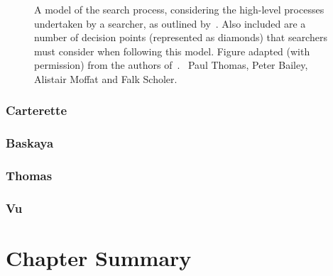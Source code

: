 \begin{figure}[t!]
    \centering
    \caption[Model of the search process by~\cite{thomas2014modelling_behaviour}]{A model of the search process, considering the high-level processes undertaken by a searcher, as outlined by~\cite{thomas2014modelling_behaviour}. Also included are a number of decision points (represented as diamonds) that searchers must consider when following this model. Figure adapted (with permission) from the authors of~\citealt{thomas2014modelling_behaviour}. \textcopyright~Paul Thomas, Peter Bailey, Alistair Moffat and Falk Scholer.}
    \label{fig:thomas_model}
\end{figure}

\subsubsection{Carterette}

\subsubsection{Baskaya}

\subsubsection{Thomas}

\subsubsection{Vu}

\section{Chapter Summary}


